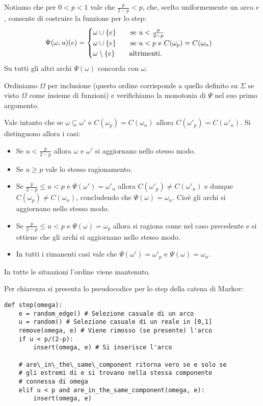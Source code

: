 \documentclass[]{marticle}
\begin{document}
Notiamo che per $0<p<1$ vale che $\frac{p}{2-p}<p$, che, scelto uniformemente un
arco $e$, consente di costruire la funzione per lo step:
\[
    \Psi(\omega,u)(e) =
    \begin{cases}
        \omega \cup \{e\} \text{\qquad se $u<\frac{p}{2-p}$}\\
        \omega \cup \{e\} \text{\qquad se $u<p$ e $C(\omega_p) =
            C(\omega_n)$}\\
        \omega \setminus \{e\} \text{\qquad altrimenti.} 

    \end{cases}
\]
Su tutti gli altri archi $\Psi(\omega)$ concorda con $\omega$.

Ordiniamo $\Omega$ per inclusione (questo ordine corrisponde a quello definito
su $\Sigma$ se visto $\Omega$ come insieme di funzioni) e verifichiamo la
monotonia di $\Psi$ nel suo primo argomento.

Vale intanto che se $\omega\subseteq\omega'$ e $C(\omega_p)=C(\omega_n)$ allora
$C(\omega'_p) = C(\omega'_n)$. Si distinguono allora i casi:
\begin{itemize}
    \item Se $u<\frac{p}{2-p}$ allora $\omega$ e $\omega'$ si aggiornano nello
        stesso modo.
    \item Se $u\geq p$ vale lo stesso ragionamento.
    \item Se $\frac{p}{2-p} \leq u < p$ e $\Psi(\omega') = \omega'_n$ allora
        $C(\omega'_p)\neq C(\omega'_n)$ e dunque $C(\omega_p)\neq C(\omega_n)$,
        concludendo che $\Psi(\omega) = \omega_n$. Cio\`e gli archi si
        aggiornano nello stesso modo.
    \item Se $\frac{p}{2-p} \leq u < p$ e $\Psi(\omega) = \omega_p$ allora si
        ragiona come nel caso precedente e si ottiene che gli archi si
        aggiornano nello stesso modo.
    \item In tutti i rimanenti casi vale che $\Psi(\omega')=\omega'_p$ e
        $\Psi(\omega)=\omega_n$.
\end{itemize}
In tutte le situazioni l'ordine viene mantenuto.

Per chiarezza si presenta lo pseudocodice per lo step della catena di Markov:
\begin{lstlisting}
def step(omega):
    e = random_edge() # Selezione casuale di un arco
    u = random() # Selezione casuale di un reale in [0,1]
    remove(omega, e) # Viene rimosso (se presente) l'arco
    if u < p/(2-p):
        insert(omega, e) # Si inserisce l'arco

    # are\_in\_the\_same\_component ritorna vero se e solo se 
    # gli estremi di e si trovano nella stessa componente
    # connessa di omega
    elif u < p and are_in_the_same_component(omega, e):
        insert(omega, e)
\end{lstlisting}
\end{document}
